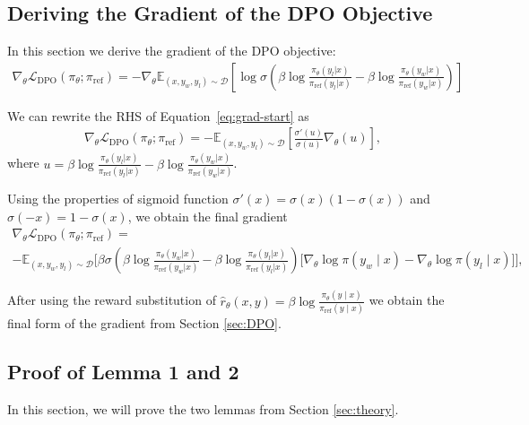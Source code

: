 \documentclass{article}
\newcommand{\piref}{\pi_\text{ref}}
\begin{document}
\subsection{Deriving the Gradient of the DPO Objective}
\label{app:gradient_derivation}
In this section we derive the gradient of the DPO objective:
\begin{align}\label{eq:grad-start}
    \nabla_{\theta}\mathcal{L}_\text{DPO}(\pi_{\theta}; \piref)
    = -\nabla_{\theta}\mathbb{E}_{(x, y_w, y_l)\sim \mathcal{D}}\left[\log \sigma \left(\beta \log \frac{\pi_{\theta}(y_l|x)}{\piref(y_l|x)} - \beta \log \frac{\pi_{\theta}(y_w|x)}{\piref(y_w|x)}\right)\right]
\end{align}

We can rewrite the RHS of Equation~\ref{eq:grad-start} as 
\begin{align}
    \nabla_{\theta}\mathcal{L}_\text{DPO}(\pi_{\theta}; \piref)
    =-\mathbb{E}_{(x, y_w, y_l)\sim \mathcal{D}}\left[\frac{\sigma'\left(u\right)}{\sigma \left(u\right)}\nabla_{\theta}\left(u\right)\right],
\end{align}
where $u = \beta \log \frac{\pi_{\theta}(y_l|x)}{\piref(y_l|x)} - \beta \log \frac{\pi_{\theta}(y_w|x)}{\piref(y_w|x)}$.

Using the properties of sigmoid function $\sigma'(x) = \sigma(x)(1-\sigma(x))$ and $\sigma(-x) = 1-\sigma(x)$, we obtain the final gradient
\begin{multline*}
\nabla_{\theta}\mathcal{L}_\text{DPO}(\pi_{\theta}; \piref) = \\
     -\mathbb{E}_{(x, y_w, y_l) \sim \mathcal{D}} \bigg[\beta\sigma \left(\beta \log \frac{\pi_{\theta}(y_w|x)}{\piref(y_w|x)} - \beta \log \frac{\pi_{\theta}(y_l|x)}{\piref(y_l|x)}\right)\bigg[\nabla_\theta\log \pi(y_w \mid x) - \nabla_\theta\log\pi(y_l \mid x)\bigg]\bigg],
\end{multline*}

After using the reward substitution of $\hat{r}_\theta(x, y) = \beta \log \frac{\pi_\theta(y \mid x)}{\piref(y \mid x)}$ we obtain the final form of the gradient from Section \ref{sec:DPO}.


\subsection{Proof of Lemma 1 and 2}
\label{app:lemma1}

In this section, we will prove the two lemmas from Section \ref{sec:theory}.
\end{document}

